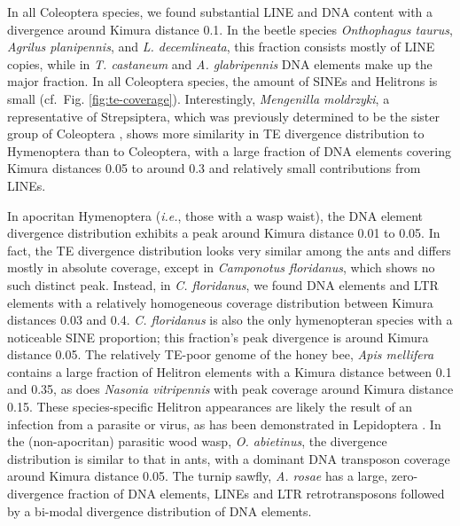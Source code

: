 In all Coleoptera species, we found substantial LINE and DNA content
with a divergence around Kimura distance 0.1. In the beetle species
\emph{Onthophagus taurus}, \emph{Agrilus planipennis}, and \emph{L.
decemlineata}, this fraction consists mostly of LINE copies, while in
\emph{T. castaneum} and \emph{A. glabripennis} DNA elements make up the
major fraction. In all Coleoptera species, the amount of SINEs and
Helitrons is small (cf.~Fig. \ref{fig:te-coverage}). Interestingly, \emph{Mengenilla
moldrzyki}, a representative of Strepsiptera, which was previously
determined to be the sister group of Coleoptera \citep{Niehuis2012},
shows more similarity in TE divergence distribution to Hymenoptera than
to Coleoptera, with a large fraction of DNA elements covering Kimura
distances 0.05 to around 0.3 and relatively small contributions from
LINEs.

In apocritan Hymenoptera (\emph{i.e.}, those with a wasp waist), the DNA
element divergence distribution exhibits a peak around Kimura distance
0.01 to 0.05. In fact, the TE divergence distribution looks very similar
among the ants and differs mostly in absolute coverage, except in
\emph{Camponotus floridanus}, which shows no such distinct peak.
Instead, in \emph{C. floridanus}, we found DNA elements and LTR elements
with a relatively homogeneous coverage distribution between Kimura
distances 0.03 and 0.4. \emph{C. floridanus} is also the only
hymenopteran species with a noticeable SINE proportion; this fraction's
peak divergence is around Kimura distance 0.05. The relatively TE-poor
genome of the honey bee, \emph{Apis mellifera} contains a large fraction
of Helitron elements with a Kimura distance between 0.1 and 0.35, as
does \emph{Nasonia vitripennis} with peak coverage around Kimura
distance 0.15. These species-specific Helitron appearances are likely
the result of an infection from a parasite or virus, as has been
demonstrated in Lepidoptera \citep{Coates2015}. In the (non-apocritan)
parasitic wood wasp, \emph{O. abietinus}, the divergence distribution is
similar to that in ants, with a dominant DNA transposon coverage around
Kimura distance 0.05. The turnip sawfly, \emph{A. rosae} has a large,
zero-divergence fraction of DNA elements, LINEs and LTR retrotransposons
followed by a bi-modal divergence distribution of DNA elements.


